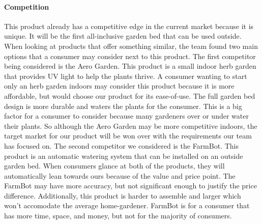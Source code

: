 \paragraph{Competition}
This product already has a competitive edge in the current market because it is unique. It will be the first all-inclusive garden bed that can be used outside. When looking at products that offer something similar, the team found two main options that a consumer may consider next to this product. The first competitor being considered is the Aero Garden. This product is a small indoor herb garden that provides UV light to help the plants thrive. A consumer wanting to start only an herb garden indoors may consider this product because it is more affordable, but would choose our product for its ease-of-use. The full garden bed design is more durable and waters the plants for the consumer. This is a big factor for a consumer to consider because many gardeners over or under water their plants. So although the Aero Garden may be more competitive indoors, the target market for our product will be won over with the requirements our team has focused on. The second competitor we considered is the FarmBot. This product is an automatic watering system that can be installed on an outside garden bed. When consumers glance at both of the products, they will automatically lean towards ours because of the value and price point. The FarmBot may have more accuracy, but not significant enough to justify the price difference. Additionally, this product is harder to assemble and larger which won't accomodate the average home-gardener. FarmBot is for a consumer that has more time, space, and money, but not for the majority of consumers.
